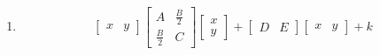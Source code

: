 \renewcommand{\theequation}{\theenumi}
\begin{enumerate}[label=\arabic*.,ref=\thesubsection.\theenumi]
\item 
\begin{align}
\begin{bmatrix}x & y\end{bmatrix}\begin{bmatrix}A & \frac{B}{2}\\\frac{B}{2} & C\end{bmatrix}\begin{bmatrix}x \\ y\end{bmatrix} + \begin{bmatrix}D & E\end{bmatrix}\begin{bmatrix}x & y\end{bmatrix} +k
\end{align}


\end{enumerate}
